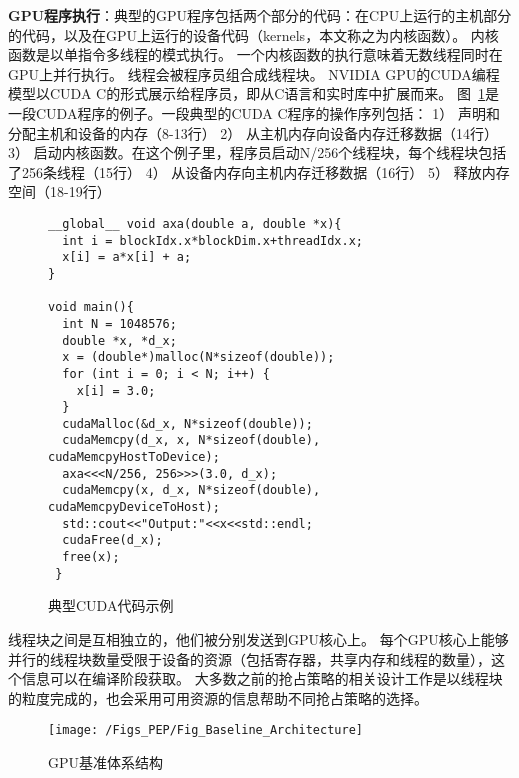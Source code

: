 \textbf{GPU程序执行}：典型的GPU程序包括两个部分的代码：在CPU上运行的主机部分的代码，以及在GPU上运行的设备代码（kernels，本文称之为内核函数）。
内核函数是以单指令多线程的模式执行。
一个内核函数的执行意味着无数线程同时在GPU上并行执行。
线程会被程序员组合成线程块。
NVIDIA GPU的CUDA编程模型以CUDA C的形式展示给程序员，即从C语言和实时库中扩展而来。
图~\ref{fig:cuda_code}是一段CUDA程序的例子。一段典型的CUDA C程序的操作序列包括：
1）	声明和分配主机和设备的内存（8-13行）
2）	从主机内存向设备内存迁移数据（14行）
3）	启动内核函数。在这个例子里，程序员启动N/256个线程块，每个线程块包括了256条线程（15行）
4）	从设备内存向主机内存迁移数据（16行）
5）	释放内存空间（18-19行）

\begin{figure}[htbp] 
  \centering
  \begin{lstlisting}[language={[ANSI]C}]
__global__ void axa(double a, double *x){
  int i = blockIdx.x*blockDim.x+threadIdx.x;
  x[i] = a*x[i] + a;
}

void main(){
  int N = 1048576;
  double *x, *d_x;
  x = (double*)malloc(N*sizeof(double));
  for (int i = 0; i < N; i++) {
  	x[i] = 3.0;
  } 
  cudaMalloc(&d_x, N*sizeof(double)); 
  cudaMemcpy(d_x, x, N*sizeof(double), cudaMemcpyHostToDevice);  
  axa<<<N/256, 256>>>(3.0, d_x);
  cudaMemcpy(x, d_x, N*sizeof(double), cudaMemcpyDeviceToHost);
  std::cout<<"Output:"<<x<<std::endl;
  cudaFree(d_x);
  free(x);
 }
  \end{lstlisting} 
\caption{典型CUDA代码示例}
\label{fig:cuda_code}
\end{figure}



线程块之间是互相独立的，他们被分别发送到GPU核心上。
每个GPU核心上能够并行的线程块数量受限于设备的资源（包括寄存器，共享内存和线程的数量），这个信息可以在编译阶段获取。
大多数之前的抢占策略的相关设计工作是以线程块的粒度完成的，也会采用可用资源的信息帮助不同抢占策略的选择。


\begin{figure}[htbp] %
  \centering
  \texttt{[image: /Figs\_PEP/Fig\_Baseline\_Architecture]}
  \caption{GPU基准体系结构}
  \label{fig:Fig_Baseline_Architecture}
\end{figure}


